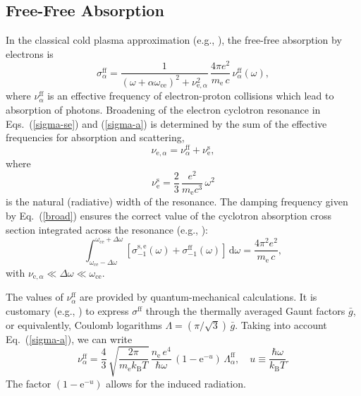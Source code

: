 \documentclass{emulateapj}
\newcommand{\beq}{\begin{equation}}
\newcommand{\eeq}{\end{equation}}
\newcommand{\req}[1]{Eq.\ (\ref{#1})}
\newcommand{\mel}{m_\mathrm{e}}
\newcommand{\dd}{\mathrm{d}}
\newcommand{\omc}{\omega_\mathrm{ce}}
\newcommand{\kB}{k_\mathrm{B}}
\begin{document}
       \subsection{Free-Free Absorption}
%
In the classical cold plasma approximation (e.g., 
\citealp{Ginzburg}), the free-free absorption by electrons is
\beq
   \sigma_\alpha^\mathrm{ff} =
          \frac{1}{(\omega+\alpha\omc)^2
             +\nu_{\mathrm{e},\alpha}^2}\, 
          \frac{4\pi e^2 
          }{ 
            \mel\, c}
            \,\nu_{\alpha}^\mathrm{ff}(\omega) ,
\label{sigma-a}
\eeq
where $\nu_{\alpha}^\mathrm{ff}$ 
is an effective frequency of electron-proton 
collisions which lead to absorption of
photons.
Broadening of the electron cyclotron resonance
in Eqs.\ (\ref{sigma-se}) and (\ref{sigma-a}) 
is determined by the sum of the effective frequencies
for absorption and scattering, 
\beq
   \nu_{\mathrm{e},\alpha}=\nu_{\alpha}^\mathrm{ff}
   +\nu_\mathrm{e}^\mathrm{s},
\label{broad}
\eeq
where 
\beq
   \nu_\mathrm{e}^\mathrm{s}=\frac{2}{3}\,\frac{e^2
   }{
         \mel c^3}\,\omega^2
\label{radfreq}
\eeq
is the natural (radiative) width of the resonance.
The damping frequency given by \req{broad}
ensures the correct value of the cyclotron absorption
cross section integrated across the resonance 
(e.g., \citealp{Ventura79}):
\beq
   \int_{\omc-\Delta\omega}^{\omc+\Delta\omega}
    [\sigma_{-1}^\mathrm{s,e} (\omega) + 
            \sigma_{-1}^\mathrm{ff}(\omega)] \,\dd \omega
         = \frac{4\pi^2e^2}{\mel\,c},
\label{cycl-osc-str}
\eeq
with $\nu_{\mathrm{e},\alpha} \ll \Delta\omega \ll \omc$.

The values of $\nu_{\alpha}^\mathrm{ff}$ are provided 
by quantum-mechanical calculations. 
It is customary 
(e.g., \citealp{Armstrong})
to express $\sigma^\mathrm{ff}$ through the
thermally averaged Gaunt factors $\bar{g}$,
or equivalently, Coulomb logarithms $\Lambda=(\pi/\sqrt{3})\,\bar{g}$.
Taking into account \req{sigma-a}, we can write
\beq
   \nu_\alpha^\mathrm{ff} =
          \frac{4}{3}\,\sqrt{\frac{2\pi}{\mel \kB T}}\,
          \frac{n_\mathrm{e}\,e^4}{\hbar \omega}\,
          \left(1-\mathrm{e}^{-u}\right)\, 
         \Lambda_\alpha^\mathrm{ff},
\quad
   u\equiv\frac{\hbar\omega}{\kB T}.
\label{nuff}
\eeq
The factor $(1-\mathrm{e}^{-u})$
allows for the induced radiation. 
\end{document}
